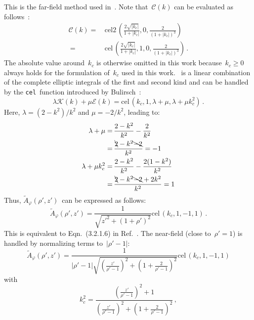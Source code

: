 This is the far-field method used in~.
Note that~$\mathcal{C}(k)$ can be evaluated as follows~\cite{bulirsch_1, bulirsch_3}:
\begin{align}
  \mathcal{C}(k) =&\, \textrm{cel2}\,\left(\frac{2 \sqrt{|k_c|}}{1+|k_c|},0,\frac{2}{(1+|k_c|)^3}\right) \nonumber \\
       ~         =&\, \textrm{cel}\,\left(\frac{2 \sqrt{|k_c|}}{1+|k_c|},1,0,\frac{2}{(1+|k_c|)^3}\right) \, .
\end{align}
The absolute value around~$k_c$ is otherwise omitted in this work
because~$k_c \geq 0$ always holds for the formulation of~$k_c$ used in this work.
~is a linear combination of the complete elliptic integrals
of the first and second kind and can be handled by the \texttt{cel}~function
introduced by Bulirsch~\cite{bulirsch_3}:
\begin{equation}
  \lambda \mathcal{K} (k) + \mu \mathcal{E} (k) = \textrm{cel}\,(k_c, 1, \lambda + \mu, \lambda + \mu k_c^2) \, .
\end{equation}
Here, $\lambda = (2 - k^2)/k^2$ and $\mu = -2/k^2$,
leading to:
\begin{align}
  \lambda + \mu       =&\, \frac{2 - k^2}{k^2} - \frac{2}{k^2} \nonumber \\
      ~               =&\, \frac{\bcancel{2} - k^2 \bcancel{-2}}{k^2} = -1 \nonumber \\
  \lambda + \mu k_c^2 =&\, \frac{2 - k^2}{k^2} - \frac{2 (1 - k^2)}{k^2} \nonumber \\
      ~               =&\, \frac{\bcancel{2} - k^2 \bcancel{-2} + 2 k^2}{k^2} = 1
\end{align}
Thus, $\tilde{A}_\varphi(\rho',z')$~can be expressed as follows:
\begin{equation}
 \tilde{A}_\varphi(\rho',z')
 = \frac{1}{\sqrt{z'^2 + (1 + \rho')^2}}
   \textrm{cel}\,(k_c, 1, -1, 1) \, . \label{eqn:cwl_A_phi_using_cel}
\end{equation}
This is equivalent to Eqn.~(3.2.1.6) in Ref.~\cite{teal}.
The near-field (close to~$\rho' = 1$) is handled by normalizing terms to~$|\rho'-1|$:
\begin{equation}
 \tilde{A}_\varphi(\rho',z')
 = \frac{1}{|\rho'-1| \sqrt{\left(\frac{z'}{\rho'-1}\right)^2 + \left(1 + \frac{2}{\rho'-1}\right)^2}}
   \textrm{cel}\,(k_c, 1, -1, 1) \label{eqn:cwl_A_phi_near}
\end{equation}
with
\begin{equation}
  k_c^2 =
  \frac{\left(\frac{z'}{\rho'-1}\right)^2 + 1}
       {\left(\frac{z'}{\rho'-1}\right)^2 + \left(1 + \frac{2}{\rho'-1}\right)^2} \, ,
\end{equation}
